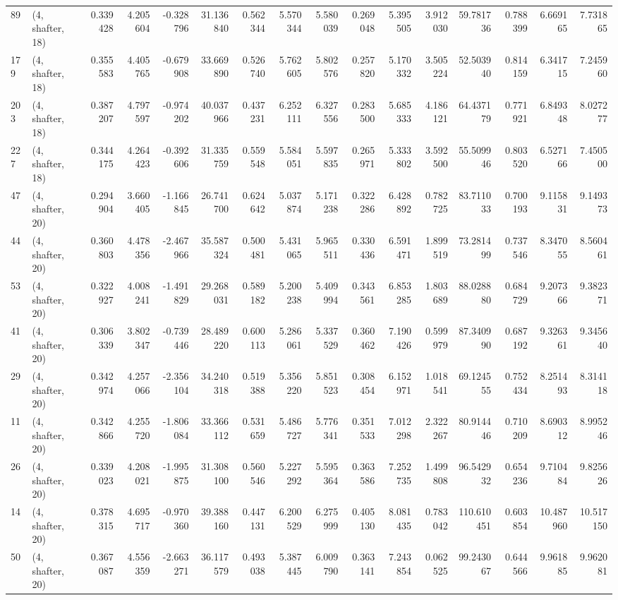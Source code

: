 \begin{tabular}{llrrrrrrrrrrrrrr}
89  &  (4, shafter, 18) &   0.339428 &   4.205604 & -0.328796 &   31.136840 &  0.562344 &   5.570344 &   5.580039 &  0.269048 &   5.395505 &   3.912030 &   59.781736 &  0.788399 &   6.669165 &   7.731865 \\
179 &  (4, shafter, 18) &   0.355583 &   4.405765 & -0.679908 &   33.669890 &  0.526740 &   5.762605 &   5.802576 &  0.257820 &   5.170332 &   3.505224 &   52.503940 &  0.814159 &   6.341715 &   7.245960 \\
203 &  (4, shafter, 18) &   0.387207 &   4.797597 & -0.974202 &   40.037966 &  0.437231 &   6.252111 &   6.327556 &  0.283500 &   5.685333 &   4.186121 &   64.437179 &  0.771921 &   6.849348 &   8.027277 \\
227 &  (4, shafter, 18) &   0.344175 &   4.264423 & -0.392606 &   31.335759 &  0.559548 &   5.584051 &   5.597835 &  0.265971 &   5.333802 &   3.592500 &   55.509946 &  0.803520 &   6.527166 &   7.450500 \\
47  &  (4, shafter, 20) &   0.294904 &   3.660405 & -1.166845 &   26.741700 &  0.624642 &   5.037874 &   5.171238 &  0.322286 &   6.428892 &   0.782725 &   83.711033 &  0.700193 &   9.115831 &   9.149373 \\
44  &  (4, shafter, 20) &   0.360803 &   4.478356 & -2.467966 &   35.587324 &  0.500481 &   5.431065 &   5.965511 &  0.330436 &   6.591471 &   1.899519 &   73.281499 &  0.737546 &   8.347055 &   8.560461 \\
53  &  (4, shafter, 20) &   0.322927 &   4.008241 & -1.491829 &   29.268031 &  0.589182 &   5.200238 &   5.409994 &  0.343561 &   6.853285 &   1.803689 &   88.028880 &  0.684729 &   9.207366 &   9.382371 \\
41  &  (4, shafter, 20) &   0.306339 &   3.802347 & -0.739446 &   28.489220 &  0.600113 &   5.286061 &   5.337529 &  0.360462 &   7.190426 &   0.599979 &   87.340990 &  0.687192 &   9.326361 &   9.345640 \\
29  &  (4, shafter, 20) &   0.342974 &   4.257066 & -2.356104 &   34.240318 &  0.519388 &   5.356220 &   5.851523 &  0.308454 &   6.152971 &   1.018541 &   69.124555 &  0.752434 &   8.251493 &   8.314118 \\
11  &  (4, shafter, 20) &   0.342866 &   4.255720 & -1.806084 &   33.366112 &  0.531659 &   5.486727 &   5.776341 &  0.351533 &   7.012298 &   2.322267 &   80.914446 &  0.710209 &   8.690312 &   8.995246 \\
26  &  (4, shafter, 20) &   0.339023 &   4.208021 & -1.995875 &   31.308100 &  0.560546 &   5.227292 &   5.595364 &  0.363586 &   7.252735 &   1.499808 &   96.542932 &  0.654236 &   9.710484 &   9.825626 \\
14  &  (4, shafter, 20) &   0.378315 &   4.695717 & -0.970360 &   39.388160 &  0.447131 &   6.200529 &   6.275999 &  0.405130 &   8.081435 &   0.783042 &  110.610451 &  0.603854 &  10.487960 &  10.517150 \\
50  &  (4, shafter, 20) &   0.367087 &   4.556359 & -2.663271 &   36.117579 &  0.493038 &   5.387445 &   6.009790 &  0.363141 &   7.243854 &   0.062525 &   99.243067 &  0.644566 &   9.961885 &   9.962081 \\
\bottomrule
\end{tabular}
